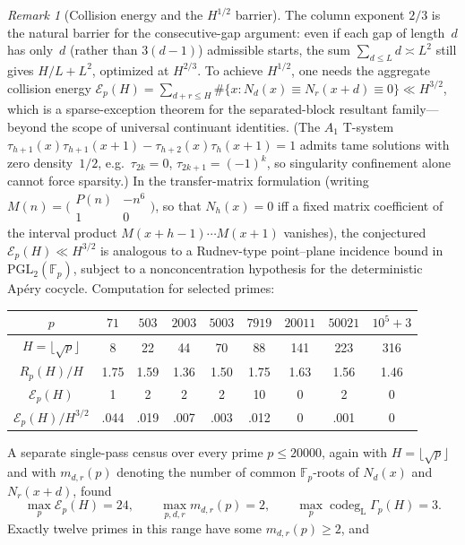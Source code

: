 \documentclass[11pt]{article}
\theoremstyle{definition}
\theoremstyle{remark}
\newtheorem{remark}[theorem]{Remark}
\begin{document}
\begin{remark}[Collision energy and the $H^{1/2}$ barrier]%
\label{rem:collision}
The column exponent $2/3$ is the natural barrier for the
consecutive-gap argument: even if each gap of length~$d$ has
only~$d$ (rather than $3(d{-}1)$) admissible starts, the
sum $\sum_{d \le L} d \asymp L^2$ still gives $H/L + L^2$,
optimized at $H^{2/3}$. To achieve $H^{1/2}$, one needs
the aggregate collision energy
$\mathcal{E}_p(H)
= \sum_{d+r \le H}\#\{x : N_d(x) \equiv N_r(x{+}d) \equiv 0\}
\ll H^{3/2}$,
which is a sparse-exception theorem for the separated-block
resultant family---beyond the scope of universal continuant
identities.
(The $A_1$ T-system $\tau_{h+1}(x)\tau_{h+1}(x+1) -
\tau_{h+2}(x)\tau_h(x+1) = 1$ admits tame solutions
with zero density~$1/2$, e.g.~$\tau_{2k}=0$,
$\tau_{2k+1}=(-1)^k$, so singularity confinement
alone cannot force sparsity.)
In the transfer-matrix formulation (writing
$M(n) = \bigl(\begin{smallmatrix}P(n)&{-n^6}\\
1&0\end{smallmatrix}\bigr)$, so that $N_h(x) = 0$
iff a fixed matrix coefficient of the interval product
$M(x{+}h{-}1)\cdots M(x{+}1)$ vanishes), the conjectured
$\mathcal{E}_p(H) \ll H^{3/2}$ is analogous to a
Rudnev-type point--plane incidence bound in
$\mathrm{PGL}_2(\mathbb{F}_p)$, subject to a
nonconcentration hypothesis for the deterministic
Ap\'ery cocycle.
Computation for selected primes:
\begin{center}
\begin{tabular}{c|cccccccc}
$p$ & $71$ & $503$ & $2003$ & $5003$ & $7919$ & $20011$ & $50021$ & $10^5{+}3$ \\
\hline
$H = \lfloor\sqrt{p}\rfloor$ & 8 & 22 & 44 & 70 & 88 & 141 & 223 & 316 \\
$R_p(H)/H$ & 1.75 & 1.59 & 1.36 & 1.50 & 1.75 & 1.63 & 1.56 & 1.46 \\
$\mathcal{E}_p(H)$ & 1 & 2 & 2 & 2 & 10 & 0 & 2 & 0 \\
$\mathcal{E}_p(H)/H^{3/2}$ & .044 & .019 & .007 & .003 & .012 & 0 & .001 & 0
\end{tabular}
\end{center}
A separate single-pass census over every prime $p\le20000$, again with
$H=\lfloor\sqrt p\rfloor$ and with $m_{d,r}(p)$ denoting the number
of common $\mathbb F_p$-roots of $N_d(x)$ and $N_r(x+d)$, found
\[
 \max_p\mathcal E_p(H)=24,
 \qquad \max_{p,d,r}m_{d,r}(p)=2,
 \qquad \max_p\operatorname{codeg}_{\mathrm L}\Gamma_p(H)=3.
\]
Exactly twelve primes in this range have some $m_{d,r}(p)\ge2$, and

\end{remark}
\end{document}
